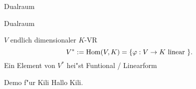 \documentclass[class=article, crop=false]{standalone}
\begin{document}
\begin{zettel}{Dualraum}
\begin{flashcard}[5ka74ejj]{Dualraum}
	\begin{definition}
		$V$ endlich dimensionaler $K$-VR
		\[
			V^\ast := \Hom(V, K) = \set{\varphi : V \to  K \tx{linear} }
		.\]
		Ein Element von $V^\ast $ hei"st Funtional / Linearform
	\end{definition}
\end{flashcard}

\begin{flashcard}[3cy918v3]{Demo f"ur Kili}
	Hallo Kili.
\end{flashcard}
\end{zettel}
\end{document}
